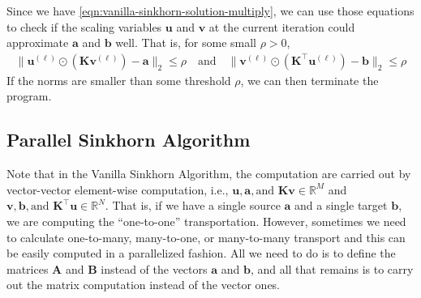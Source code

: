 \begin{remark}
  Since we have \cref{eqn:vanilla-sinkhorn-solution-multiply}, we can use those equations to check if the scaling variables
  $\mathbf{u}$ and $\mathbf{v}$ at the current iteration could approximate $\mathbf{a}$ and $\mathbf{b}$ well.
  That is, for some small $\rho > 0$,
  \begin{equation*}
    \begin{aligned}
      \lVert \mathbf{u}^{(\ell)} \odot \left(\mathbf{K} \mathbf{v}^{(\ell)}\right) - \mathbf{a}\rVert_2 \le \rho
      \quad\text{and}\quad
      \lVert \mathbf{v}^{(\ell)} \odot \left(\mathbf{K}^\top \mathbf{u}^{(\ell)}\right) - \mathbf{b}\rVert_2 \le \rho
    \end{aligned}
  \end{equation*}
  If the norms are smaller than some threshold $\rho$, we can then terminate the program.
\end{remark}


\subsection{Parallel Sinkhorn Algorithm}\label{subsec:parallel-sinkhorn}

Note that in the Vanilla Sinkhorn Algorithm, the computation are carried out by vector-vector element-wise computation,
i.e., $\mathbf{u}, \mathbf{a}, \text{and } \mathbf{K}\mathbf{v} \in \mathbb{R}^M$
and $\mathbf{v}, \mathbf{b}, \text{and } \mathbf{K}^\top \mathbf{u} \in \mathbb{R}^N$.
That is, if we have a single source $\mathbf{a}$ and a single target $\mathbf{b}$,
we are computing the ``one-to-one'' transportation.
However, sometimes we need to calculate one-to-many, many-to-one, or many-to-many transport
and this can be easily computed in a parallelized fashion.
All we need to do is to define the matrices $\mathbf{A}$ and $\mathbf{B}$ instead of the vectors $\mathbf{a}$ and $\mathbf{b}$,
and all that remains is to carry out the matrix computation instead of the vector ones.

